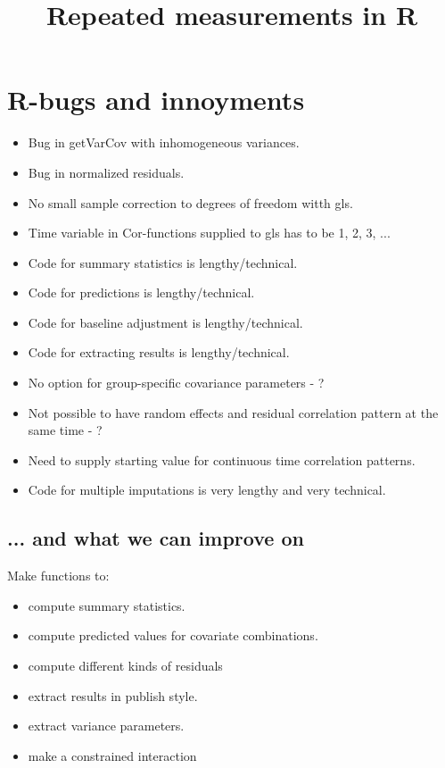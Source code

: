 \documentclass[a4paper,10pt]{article}
\title{Repeated measurements in R}
\begin{document}
\maketitle

\section*{R-bugs and innoyments}

\begin{itemize}
\item Bug in getVarCov with inhomogeneous variances.
\item Bug in normalized residuals.
\item No small sample correction to degrees of freedom witth gls.
\item Time variable in Cor-functions supplied to gls has to be 1, 2, 3, ...
\item Code for summary statistics is lengthy/technical.
\item Code for predictions is lengthy/technical.
\item Code for baseline adjustment is lengthy/technical.
\item Code for extracting results is lengthy/technical.
\item No option for group-specific covariance parameters - ?
\item Not possible to have random effects and residual correlation pattern at the same time - ?
\item Need to supply starting value for continuous time correlation patterns.
\item Code for multiple imputations is very lengthy and very technical.
\end{itemize}

\subsection*{... and what we can improve on}

Make functions to:
\begin{itemize}
\item compute summary statistics.
\item compute predicted values for covariate combinations.
\item compute different kinds of residuals
\item extract results in publish style.
\item extract variance parameters.
\item make a constrained interaction
\end{itemize}
\end{document}
